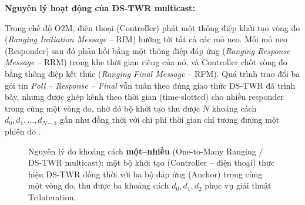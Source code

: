 \par\vspace{0.5em}
\textbf{Nguyên lý hoạt động của DS-TWR multicast:}
\par\vspace{0.3em}
Trong chế độ O2M, điện thoại (Controller) phát một thông điệp khởi tạo vòng đo (\textit{Ranging Initiation Message} -- RIM) hướng tới tất cả các mỏ neo. Mỗi mỏ neo (Responder) sau đó phản hồi bằng một thông điệp đáp ứng (\textit{Ranging Response Message} -- RRM) trong khe thời gian riêng của nó, và Controller chốt vòng đo bằng thông điệp kết thúc (\textit{Ranging Final Message} -- RFM). Quá trình trao đổi ba gói tin \textit{Poll -- Response -- Final} vẫn tuân theo đúng giao thức DS-TWR đã trình bày, nhưng được ghép kênh theo thời gian (time-slotted) cho nhiều responder trong cùng một vòng đo, nhờ đó bộ khởi tạo thu được $N$ khoảng cách $d_0, d_1, \dots, d_{N-1}$ gần như đồng thời với chi phí thời gian chỉ tương đương một phiên đo \cite{neirynck2016overview,fira_uwb_ranging}.

\begin{figure}[H]
    \centering
    \caption[Nguyên lý đo khoảng cách một–nhiều (One-to-Many Ranging)]{Nguyên lý đo khoảng cách \textbf{một–nhiều} (One-to-Many Ranging / DS-TWR multicast): một bộ khởi tạo (Controller -- điện thoại) thực hiện DS-TWR đồng thời với ba bộ đáp ứng (Anchor) trong cùng một vòng đo, thu được ba khoảng cách $d_0, d_1, d_2$ phục vụ giải thuật Trilateration.}
    \label{fig:one_to_many_ranging}
\end{figure}

